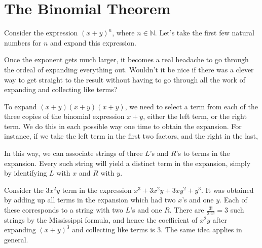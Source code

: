 \section{The Binomial Theorem}

Consider the expression $(x+y)^n$, where $n \in \mathbb{N}$. Let's take the first few natural numbers for $n$ and expand this expression.

\vspace*{-0.5em}
\par 
Once the exponent gets much larger, it becomes a real headache to go through the ordeal of expanding everything out. Wouldn't it be nice if there was a clever way to get straight to the result without having to go through all the work of expanding and collecting like terms?
\par
To expand $(x+y)(x+y)(x+y)$, we need to select a term from each of the three copies of the binomial expression $x+y$, either the left term, or the right term. We do this in each possible way one time to obtain the expansion. For instance, if we take the left term in the first two factors, and the right in the last,
\par
In this way, we can associate strings of three $L$'s and $R$'s to terms in the expansion. Every such string will yield a distinct term in the expansion, simply by identifying $L$ with $x$ and $R$ with $y$.
\par
Consider the $3x^2y$ term in the expression $x^3 + 3x^2y + 3xy^2 + y^3$. It was obtained by adding up all terms in the expansion which had two $x$'s and one $y$. Each of these corresponds to a string with two $L$'s and one $R$. There are $\frac{3!}{2!1!} =3$ such strings by the Mississippi formula, and hence the coefficient of $x^2y$ after expanding $(x+y)^3$ and collecting like terms is $3$. The same idea applies in general.
